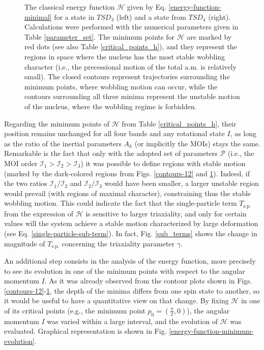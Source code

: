 \documentclass[myclassdoc,debug]{rjparticle}
\begin{document}
\begin{figure}
\begin{minipage}{.5\textwidth}
\end{minipage}
\caption{The classical energy function $\mathcal{H}$ given by Eq. \ref{energy-function-minimal} for a state in $TSD_3$ (left) and a state from $TSD_4$ (right). Calculations were performed with the numerical parameters given in Table \ref{parameter_set}. The minimum points for $\mathcal{H}$ are marked by red dots (see also Table \ref{critical_points_h}), and they represent the regions in space where the nucleus has the most stable wobbling character (i.e., the precessional motion of the total a.m. is relatively small). The closed contours represent trajectories surrounding the minimum points, where wobbling motion can occur, while the contours surrounding all three minima represent the unstable motion of the nucleus, where the wobbling regime is forbidden.}
    \label{contours-34}
\end{figure}

Regarding the minimum points of $\mathcal{H}$ from Table \ref{critical_points_h}, their position remains unchanged for all four bands and any rotational state $I$, as long as the ratio of the inertial parameters $A_k$ (or implicitly the MOIs) stays the same. Remarkable is the fact that only with the adopted set of parameters $\mathcal{P}$ (i.e., the MOI order $\mathcal{I}_1>\mathcal{I}_2>\mathcal{I}_3$) it was possible to define regions with stable motion (marked by the dark-colored regions from Figs. \ref{contours-12} and \ref{contours-34}). Indeed, if the two ratios $\mathcal{I}_1/\mathcal{I}_2$ and $\mathcal{I}_2/\mathcal{I}_3$ would have been smaller, a larger unstable region would prevail (with regions of maximal character), constraining thus the stable wobbling motion. This could indicate the fact that the single-particle term $T_\text{s.p.}$ from the expression of $\mathcal{H}$ is sensitive to larger triaxiality, and only for certain values will the system achieve a stable motion characterized by large deformation (see Eq. \ref{single-particle-sub-term}). In fact, Fig. \ref{sub_terms} shows the change in magnitude of $T_\text{s.p.}$ concerning the triaxiality parameter $\gamma$.

An additional step consists in the analysis of the energy function, more precisely to see its evolution in one of the minimum points with respect to the angular momentum $I$. As it was already observed from the contour plots shown in Figs. \ref{contours-12}-\ref{contours-34}, the depth of the minima differs from one spin state to another, so it would be useful to have a quantitative view on that change. By fixing $\mathcal{H}$ in one of its critical points (e.g., the minimum point $p_0=(\frac{\pi}{2},0)$), the angular momentum $I$ was varied within a large interval, and the evolution of $\mathcal{H}$ was evaluated. Graphical representation is shown in Fig. \ref{energy-function-minimum-evolution}.
\end{document}
